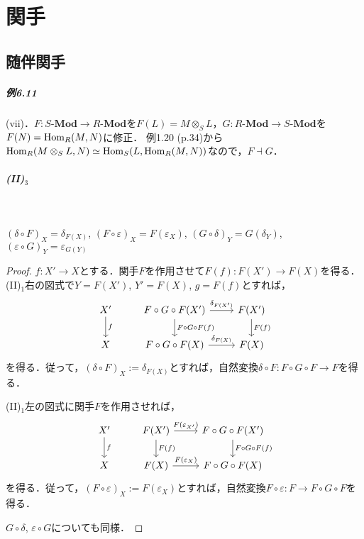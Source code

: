 \setcounter{chapter}{5}
\chapter{関手}
\setcounter{section}{3}
\section{随伴関手}
\paragraph{例6.11}
(vii)．$F \colon S\text{-}\mathbf{Mod} \to R\text{-}\mathbf{Mod}$を$F(L) = M \otimes_S L$，$G \colon R\text{-}\mathbf{Mod} \to S\text{-}\mathbf{Mod}$を$F(N) =\operatorname{Hom}_R(M, N)$に修正．
例1.20 (p.34)から$\operatorname{Hom}_R(M \otimes_S L, N) \simeq \operatorname{Hom}_S(L, \operatorname{Hom}_R(M, N))$なので，$F \dashv G$．

\paragraph{(II)$_3$}~
\begin{screen}
  $(\delta \circ F)_X = \delta_{F(X)}$, $(F \circ \varepsilon)_X = F(\varepsilon_X)$,
  $(G \circ \delta)_Y = G(\delta_Y)$, $(\varepsilon \circ G)_Y = \varepsilon_{G(Y)}$
\end{screen}
\begin{proof}
  $f \colon X' \to X$とする．関手$F$を作用させて$F(f) \colon F(X') \to F(X)$を得る．
  (II)$_1$右の図式で$Y = F(X')$, $Y' = F(X)$, $g = F(f)$とすれば，
  \[
  \begin{tikzcd}
    X' \arrow[d, "f"] & F \circ G \circ F (X') \arrow[r, "\delta_{F(X')}"] \arrow[d, "F \circ G \circ F (f)"] & F(X') \arrow[d, "F(f)"] \\
    X & F \circ G \circ F (X) \arrow[r, "\delta_{F(X)}"] & F(X)
  \end{tikzcd}
  \]
  を得る．従って，$(\delta \circ F)_X := \delta_{F(X)}$とすれば，自然変換$\delta \circ F \colon F \circ G \circ F \to F$を得る．

  (II)$_1$左の図式に関手$F$を作用させれば，
  \[
  \begin{tikzcd}
    X' \arrow[d, "f"] & F (X') \arrow[r, "F(\varepsilon_{X'})"] \arrow[d, "F(f)"] & F \circ G \circ F(X') \arrow[d, "F \circ G \circ F (f)"] \\
    X & F (X) \arrow[r, "F(\varepsilon_X)"] & F \circ G \circ F(X)
  \end{tikzcd}
  \]
  を得る．従って，$(F \circ \varepsilon)_X := F(\varepsilon_X)$とすれば，自然変換$F \circ \varepsilon \colon F \to F \circ G \circ F$を得る．

  $G \circ \delta$, $\varepsilon \circ G$についても同様．
\end{proof}

